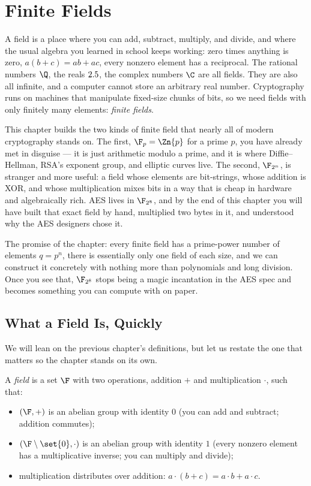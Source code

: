 \chapter{Finite Fields}

A field is a place where you can add, subtract, multiply, and divide, and
where the usual algebra you learned in school keeps working: zero times
anything is zero, $a(b+c)=ab+ac$, every nonzero element has a reciprocal.
The rational numbers $\Q$, the reals $2.5$, the complex numbers $\C$ are all
fields. They are also all infinite, and a computer cannot store an arbitrary
real number. Cryptography runs on machines that manipulate fixed-size chunks
of bits, so we need fields with only finitely many elements: \emph{finite
fields}.

This chapter builds the two kinds of finite field that nearly all of modern
cryptography stands on. The first, $\F_p = \Zn{p}$ for a prime $p$, you have
already met in disguise --- it is just arithmetic modulo a prime, and it is
where Diffie--Hellman, RSA's exponent group, and elliptic curves live. The
second, $\F_{2^n}$, is stranger and more useful: a field whose elements are
bit-strings, whose addition is XOR, and whose multiplication mixes bits in a
way that is cheap in hardware and algebraically rich. AES lives in
$\F_{2^8}$, and by the end of this chapter you will have built that exact
field by hand, multiplied two bytes in it, and understood why the AES
designers chose it.

The promise of the chapter: every finite field has a prime-power number of
elements $q = p^n$, there is essentially only one field of each size, and we
can construct it concretely with nothing more than polynomials and long
division. Once you see that, $\F_{2^8}$ stops being a magic incantation in
the AES spec and becomes something you can compute with on paper.

\chapterline

\section{What a Field Is, Quickly}
\label{ch06:what-is-field}

We will lean on the previous chapter's definitions, but let us restate the
one that matters so the chapter stands on its own.

\begin{definition}[Field]
\label{ch06:def-field}
A \emph{field} is a set $\F$ with two operations, addition $+$ and
multiplication $\cdot$, such that:
\begin{itemize}
  \item $(\F, +)$ is an abelian group with identity $0$ (you can add and
        subtract; addition commutes);
  \item $(\F \setminus \set{0}, \cdot)$ is an abelian group with identity
        $1$ (every nonzero element has a multiplicative inverse; you can
        multiply and divide);
  \item multiplication distributes over addition: $a\cdot(b+c) = a\cdot b +
        a\cdot c$.
\end{itemize}
\end{definition}


